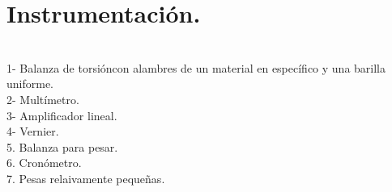 \documentclass[11pt,a4paper]{article}
\begin{document}
\section{Instrumentaci\'{o}n.}\\
1- Balanza de torsi\'{o}ncon alambres de un material en espec\'{i}fico y una barilla uniforme.\\
2- Mult\'{i}metro.\\
3- Amplificador lineal. \\
4- Vernier. \\
5. Balanza para pesar.\\
6. Cron\'{o}metro.\\
7. Pesas relaivamente peque\~{n}as.\\

\end{document}
